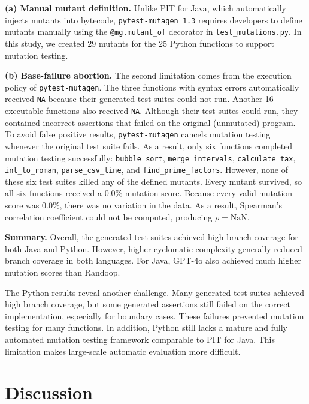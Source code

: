 \documentclass[conference]{IEEEtran}
\begin{document}
\textbf{(a) Manual mutant definition.}
Unlike PIT for Java, which automatically injects mutants into bytecode, \texttt{pytest-mutagen 1.3} requires developers to define mutants manually using the \texttt{@mg.mutant\_of} decorator in \texttt{test\_mutations.py}. In this study, we created 29 mutants for the 25 Python functions to support mutation testing.

\textbf{(b) Base-failure abortion.}
The second limitation comes from the execution policy of \texttt{pytest-mutagen}.
The three functions with syntax errors automatically received \texttt{NA} because their generated test suites could not run.
Another 16 executable functions also received \texttt{NA}. Although their test suites could run, they contained incorrect assertions that failed on the original (unmutated) program. To avoid false positive results, \texttt{pytest-mutagen} cancels mutation testing whenever the original test suite fails.
As a result, only six functions completed mutation testing successfully: \texttt{bubble\_sort}, \texttt{merge\_intervals}, \texttt{calculate\_tax}, \texttt{int\_to\_roman}, \texttt{parse\_csv\_line}, and \texttt{find\_prime\_factors}.
However, none of these six test suites killed any of the defined mutants. Every mutant survived, so all six functions received a 0.0\% mutation score.
Because every valid mutation score was 0.0\%, there was no variation in the data. As a result, Spearman's correlation coefficient could not be computed, producing $\rho = \text{NaN}$.

\textbf{Summary.}
Overall, the generated test suites achieved high branch coverage for both Java and Python. However, higher cyclomatic complexity generally reduced branch coverage in both languages. For Java, GPT-4o also achieved much higher mutation scores than Randoop.

The Python results reveal another challenge. Many generated test suites achieved high branch coverage, but some generated assertions still failed on the correct implementation, especially for boundary cases. These failures prevented mutation testing for many functions. In addition, Python still lacks a mature and fully automated mutation testing framework comparable to PIT for Java. This limitation makes large-scale automatic evaluation more difficult.


\section{Discussion}
\label{sec:discussion}
\end{document}
